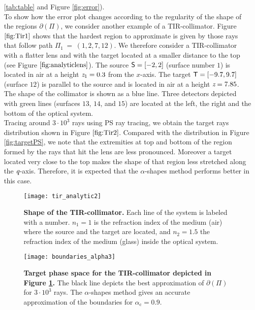  \ref{tab:table} and Figure \ref{fig:error}).
 \\\indent To show how the error plot changes according to the regularity of the shape of the regions $\partial$$(\Pi)$, we consider another example of a TIR-collimator.
 Figure $\ref{fig:Tir1}$ shows that the hardest region to approximate is given by those rays that follow path $\Pi_1 ~=~ (1,2,7,12)$.
 We therefore consider a TIR-collimator with a flatter lens and with the target located at a smaller distance to the top (see Figure $\ref{fig:analyticlens}$). 
The source $\textsf{S}= [-2,2]$ (surface number $1$) is located in air at a height $\textit{z}_1 = 0.3$ from the $x$-axis.
       The target $\textsf{T}= [-9.7, 9.7]$ (surface $12$) is parallel to the source and is located in air at a height $ \textit{z}= 7.85$.
       The shape of the collimator is shown as a blue line.
       Three detectors depicted with green lines (surfaces $13$, $14$, and $15$) are located at the left, the right and the bottom of the optical system.
 \\ \indent Tracing around $3\cdot10^3$ rays using PS ray tracing, we obtain the target rays distribution shown in Figure $\ref{fig:Tir2}$. 
Compared with the distribution in Figure \ref{fig:targetPS}, we note that the extremities at top and bottom of the region formed by the rays that hit the lens are less pronounced.
Moreover a target located very close to the top makes the shape of that region less stretched along the $\textit{q}$-axis.
Therefore, it is expected that the $\alpha$-shapes method performs better in this case.
\begin{figure}[t]
  \begin{center}
  \texttt{[image: tir\_analytic2]}
   \end{center}
    \caption{\textbf{Shape of the TIR-collimator.} Each line of the system is labeled with a number.
       $n_1 = 1$ is the refraction index of the medium (air) where the source and the target are located, and
       $n_2 = 1.5 $ the refraction index of the medium (glass) inside the optical system.} 
 \label{fig:analyticlens}
\end{figure}
 \begin{figure}[t]
  \begin{center}
       \texttt{[image: boundaries\_alpha3]}
   \end{center}
        \caption{\textbf{Target phase space for the TIR-collimator depicted in
        Figure \ref{fig:analyticlens}.} The black line depicts the best approximation of $\partial$$(\Pi)$ for $3\cdot 10^3$ rays. 
The $\alpha$-shapes method gives an accurate approximation of the boundaries for $\alpha_\textrm{c} = 0.9$.}
  \label{fig:Tir2}
\end{figure}
